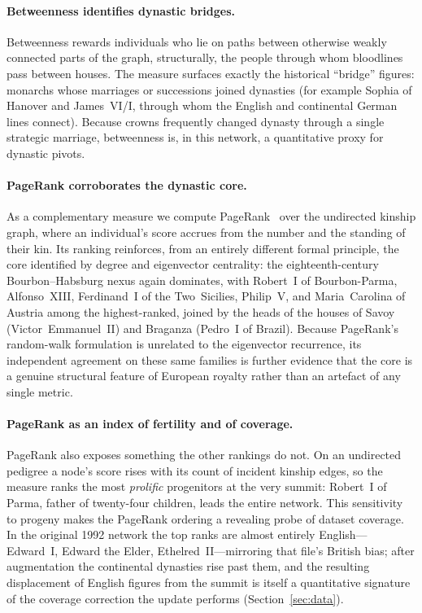 \paragraph{Betweenness identifies dynastic bridges.}
Betweenness rewards individuals who lie on paths between otherwise weakly connected
parts of the graph, structurally, the people through whom bloodlines pass between
houses. The measure surfaces exactly the historical ``bridge'' figures: monarchs
whose marriages or successions joined dynasties (for example Sophia of Hanover and
James~VI/I, through whom the English and continental German lines connect). Because
crowns frequently changed dynasty through a single strategic marriage, betweenness
is, in this network, a quantitative proxy for dynastic pivots.

\paragraph{PageRank corroborates the dynastic core.}
As a complementary measure we compute PageRank~\cite{page1999pagerank} over the
undirected kinship graph, where an individual's score accrues from the number and
the standing of their kin. Its ranking reinforces, from an entirely different
formal principle, the core identified by degree and eigenvector centrality: the
eighteenth-century Bourbon--Habsburg nexus again dominates, with Robert~I of
Bourbon-Parma, Alfonso~XIII, Ferdinand~I of the Two~Sicilies, Philip~V, and
Maria~Carolina of Austria among the highest-ranked, joined by the heads of the
houses of Savoy (Victor~Emmanuel~II) and Braganza (Pedro~I of Brazil). Because
PageRank's random-walk formulation is unrelated to the eigenvector recurrence, its
independent agreement on these same families is further evidence that the core is a
genuine structural feature of European royalty rather than an artefact of any
single metric.

\paragraph{PageRank as an index of fertility and of coverage.}
PageRank also exposes something the other rankings do not. On an undirected
pedigree a node's score rises with its count of incident kinship edges, so the
measure ranks the most \emph{prolific} progenitors at the very summit: Robert~I of
Parma, father of twenty-four children, leads the entire network. This sensitivity
to progeny makes the PageRank ordering a revealing probe of dataset coverage. In
the original 1992 network the top ranks are almost entirely English---Edward~I,
Edward the Elder, Ethelred~II---mirroring that file's British bias; after
augmentation the continental dynasties rise past them, and the resulting
displacement of English figures from the summit is itself a quantitative signature
of the coverage correction the update performs (Section~\ref{sec:data}).

